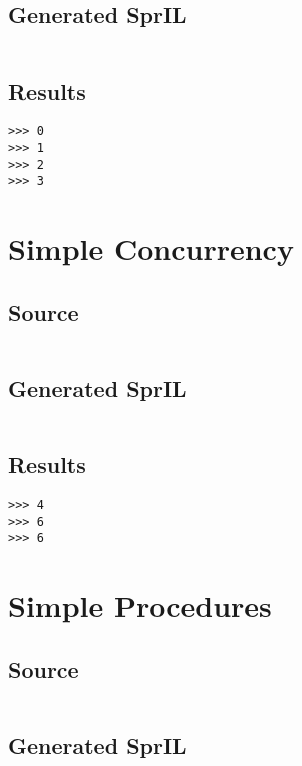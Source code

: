 \documentclass[twoside]{report}
\begin{document}
\subsection{Generated SprIL}
\inputminted[tabsize=4,linenos,firstnumber=0]{text}{../../src/haskell/PP-project-2016/test/recursion_gen.txt}
\subsection{Results}
\begin{verbatim}
>>> 0
>>> 1
>>> 2
>>> 3
\end{verbatim}

\section{Simple Concurrency}
\subsection{Source}
\inputminted[tabsize=4,linenos,firstnumber=1]{text}{../../src/haskell/PP-project-2016/test/simple_concurrency.shl}
\subsection{Generated SprIL}
\inputminted[tabsize=4,linenos,firstnumber=0]{text}{../../src/haskell/PP-project-2016/test/simple_concurrency_gen.txt}
\subsection{Results}
\begin{verbatim}
>>> 4
>>> 6
>>> 6
\end{verbatim}

\section{Simple Procedures}
\subsection{Source}
\inputminted[tabsize=4,linenos,firstnumber=1]{text}{../../src/haskell/PP-project-2016/test/simple_proc.shl}
\subsection{Generated SprIL}
\inputminted[tabsize=4,linenos,firstnumber=0]{text}{../../src/haskell/PP-project-2016/test/simple_proc_gen.txt}
\end{document}
